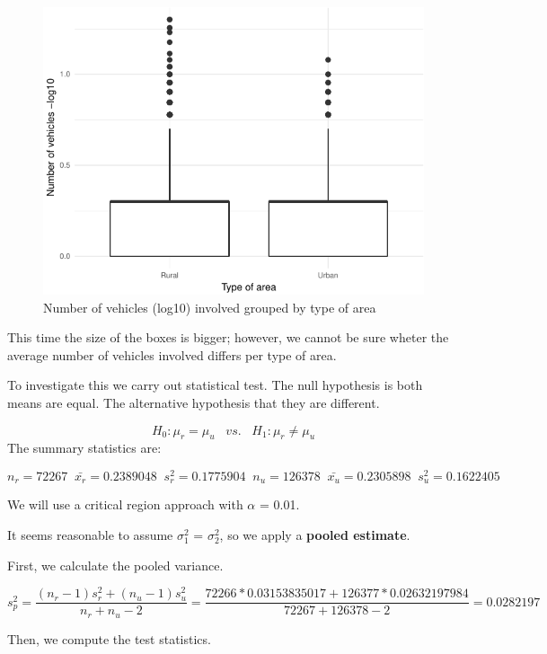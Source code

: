 \documentclass[]{article}
\begin{document}
\begin{figure}[H]

{\centering \includegraphics{READMEv4_files/figure-latex/fig3-1} 

}

\caption{Number of vehicles (log10) involved grouped by type of area}\label{fig:fig3}
\end{figure}

This time the size of the boxes is bigger; however, we cannot be sure
wheter the average number of vehicles involved differs per type of area.

To investigate this we carry out statistical test. The null hypothesis
is both means are equal. The alternative hypothesis that they are
different.

\[H_{0}: \mu_{r} = \mu_{u}\;\;\;vs.\;\;\;H_{1}: \mu_{r} \neq \mu_{u}\]
The summary statistics are:

\[n_{r}=72267\;\;\bar{x_{r}}=0.2389048\;\;s_{r}^{2}=0.1775904\;\;n_{u}=126378\;\;\bar{x_{u}}=0.2305898\;\;s_{u}^{2}=0.1622405\]

We will use a critical region approach with \(\alpha\) = 0.01.

It seems reasonable to assume \(\sigma_{1}^{2}\) = \(\sigma_{2}^{2}\),
so we apply a \textbf{pooled estimate}.

First, we calculate the pooled variance.

\[s_{p}^{2}=\frac{(n_{r}-1)s_{r}^{2}+(n_{u}-1)s_{u}^{2}}{n_{r}+n_{u}-2} = \frac{72266*0.03153835017+126377*0.02632197984}{72267+126378-2}=0.0282197\]

Then, we compute the test statistics.
\end{document}
